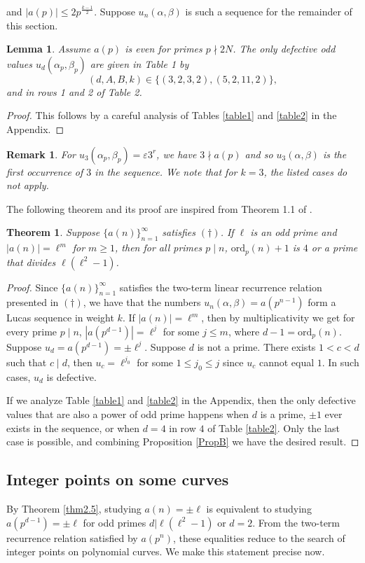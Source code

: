 \documentclass[12pt]{amsart}
\newtheorem*{remark}{Remark}
\newtheorem{thm}{Theorem}[section]
\newtheorem{lem}{Lemma}[section]
\newcommand{\ord}{\mathrm{ord}}
\numberwithin{equation}{section}
\begin{document}
and $|a(p)|\leq2p^{\frac{k-1}{2}}$. Suppose $u_n(\alpha,\beta)$ is such a sequence for the remainder of this section.
\begin{lem}\label{nondefect}
Assume $a(p)$ is even for primes $p\nmid 2N$. The only defective odd values $u_d(\alpha_p,\beta_p)$ are given in Table 1 by $$(d,A,B,k)\in\{(3,2,3,2),(5,2,11,2)\},$$ and in rows 1 and 2 of Table 2.
\end{lem}
\begin{proof}
This follows by a careful analysis of Tables \ref{table1} and \ref{table2} in the Appendix. 
\end{proof}
\begin{remark}
For $u_3(\alpha_p,\beta_p)=\varepsilon 3^r$, we have $3\nmid a(p)$ and so $u_3(\alpha,\beta)$ is the first occurrence of $3$ in the sequence. We note that for $k=3$, the listed cases do not apply. 
\end{remark}
The following theorem and its proof are inspired from Theorem 1.1 of \cite{BCOT}.
\begin{thm}{\label{thm2.5}}
Suppose $\{a(n)\}_{n=1}^{\infty}$ satisfies $(\dagger)$. If $\ell$ is an odd prime and $|a(n)|=\ell^m$ for $m\ge 1$, then for all primes $p\mid n$, $\ord _p(n)+1$ is $4$ or a prime that divides $ \ell(\ell^2-1)$. 
\end{thm}
\begin{proof}
Since $\{a(n)\}_{n=1}^{\infty}$ satisfies the two-term linear recurrence relation presented in $(\dagger)$, we have that the numbers $u_n(\alpha,\beta)=a(p^{n-1})$ form a Lucas sequence in weight $k$. If $|a(n)|=\ell^m$, then by multiplicativity we get for every prime $p\mid n$, $|a(p^{d-1})|=\ell^j$ for some $j\leq m$, where $d-1=\ord_p(n)$. Suppose $u_d=a(p^{d-1})=\pm \ell^j$. Suppose $d$ is not a prime. There exists $1<c<d$ such that $c\mid d$, then $u_c=\ell^{j_0}$ for some $1\le j_0\le j$ since $u_c$ cannot equal $1$. In such cases, $u_d$ is defective.

If we analyze Table \ref{table1}
and \ref{table2} in the Appendix, then the only defective values that are also a power of odd prime happens when $d$ is a prime, $\pm 1$ ever exists in the sequence, or when $d=4$ in row $4$ of Table \ref{table2}. Only the last case is possible, and combining Proposition \ref{PropB} we have the desired result.
\end{proof}



\subsection{Integer points on some curves}{\label{IPSC}} By Theorem \ref{thm2.5}, studying $a(n)=\pm\ell$ is equivalent to studying $a(p^{d-1})=\pm\ell$ for odd primes $d|\ell(\ell^2-1)$ or $d=2$. From the two-term recurrence relation satisfied by $a(p^n)$, these equalities reduce to the search of integer points on polynomial curves. We make this statement precise now. 
\end{document}
